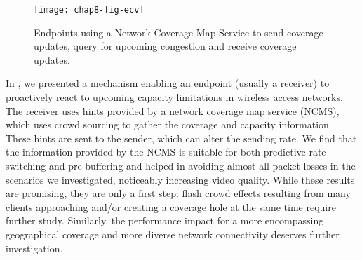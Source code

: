 \begin{figure}
\texttt{[image: chap8-fig-ecv]}
\caption{Endpoints using a Network Coverage Map Service to send coverage updates, query for upcoming congestion and receive coverage updates.}
\label{fig:cc:ecv}
\end{figure}


In , we presented a mechanism enabling an endpoint (usually a
receiver) to proactively react to upcoming capacity limitations in wireless
access networks. The receiver uses hints provided by a network coverage map
service (NCMS), which uses crowd sourcing to gather the coverage and capacity
information. These hints are sent to the sender, which can alter the sending
rate. We find that the information provided by the NCMS is suitable for both
predictive rate-switching and pre-buffering and helped in avoiding almost all
packet losses in the scenarios we investigated, noticeably increasing video
quality. While these results are promising, they are only a first step: flash
crowd effects resulting from many clients approaching and/or creating a
coverage hole at the same time require further study. Similarly, the
performance impact for a more encompassing geographical coverage and more
diverse network connectivity deserves further investigation.
